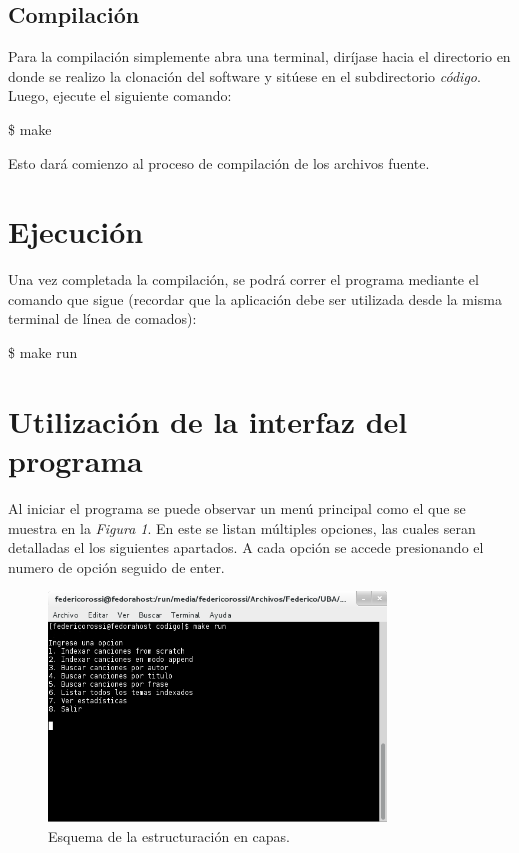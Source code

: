 \documentclass{article}
\begin{document}
\subsection{Compilación}

	Para la compilación simplemente abra una terminal, diríjase hacia el directorio en donde se realizo la clonación del software y sitúese en el subdirectorio \textit{código}. Luego, ejecute el siguiente comando:
	\bigskip

	\colorbox{gray95}{{\ttfamily\footnotesize
	\$ make\\}}
	\bigskip

	Esto dará comienzo al proceso de compilación de los archivos fuente.
\bigskip\medskip




\section{Ejecución}

	Una vez completada la compilación, se podrá correr el programa mediante el comando que sigue (recordar que la aplicación debe ser utilizada desde la misma terminal de línea de comados):
	\bigskip

	\colorbox{gray95}{{\ttfamily\footnotesize
	\$ make run\\}}
	\medskip



\section{Utilización de la interfaz del programa}

	Al iniciar el programa se puede observar un menú principal como el que se muestra en la \textit{Figura 1}. En este se listan múltiples opciones, las cuales seran detalladas el los siguientes apartados. A cada opción se accede presionando el numero de opción seguido de enter.
	\bigskip

\begin{figure}[h]
	\centering
	\includegraphics[width=0.80\textwidth]{images/menu.png}
	\medskip
	\caption{Esquema de la estructuración en capas.}
\end{figure}
\bigskip\smallskip
\end{document}
